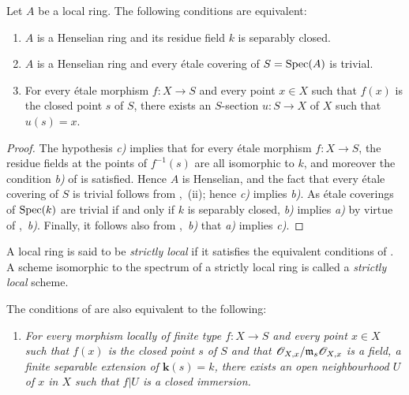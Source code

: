 \begin{proposition}[18.8.1]
\label{IV.18.8.1}
Let $A$ be a local ring.
The following conditions are equivalent:
\begin{enumerate}[label=\emph{\alph*)}]
  \item $A$ is a Henselian ring and its residue field $k$ is separably closed.
  \item $A$ is a Henselian ring and every \'{e}tale covering of $S=\operatorname{Spec}(A)$ is trivial.
  \item For every \'{e}tale morphism $f:X\to S$ and every point $x\in X$ such that $f(x)$ is the closed point $s$ of $S$, there exists an $S$-section $u:S\to X$ of $X$ such that $u(s)=x$.
\end{enumerate}
\end{proposition}

\begin{proof}
The hypothesis \emph{c)} implies that for every \'{e}tale morphism $f:X\to S$, the residue fields at the points of $f^{-1}(s)$ are all isomorphic to $k$, and moreover the condition \emph{b)} of  is satisfied.
Hence $A$ is Henselian, and the fact that every \'{e}tale covering of $S$ is trivial follows from ,~(ii);
hence \emph{c)} implies \emph{b)}.
As \'{e}tale coverings of $\operatorname{Spec}(k)$ are trivial if and only if $k$ is separably closed, \emph{b)} implies \emph{a)} by virtue of ,~\emph{b)}.
Finally, it follows also from ,~\emph{b)} that \emph{a)} implies \emph{c)}.
\end{proof}

\begin{definition}[18.8.2]
\label{IV.18.8.2}
A local ring is said to be \emph{strictly local} if it satisfies the equivalent conditions of .
A scheme isomorphic to the spectrum of a strictly local ring is called a \emph{strictly local} scheme.
\end{definition}

\begin{remark}[18.8.3]
\label{IV.18.8.3}
The conditions of  are also equivalent to the following:
\begin{enumerate}
  \item[\textup{d)}] \itshape For every morphism locally of finite type $f:X\to S$ and every point $x\in X$ such that $f(x)$ is the closed point $s$ of $S$ and that $\mathscr{O}_{X,x}/\mathfrak{m}_s\mathscr{O}_{X,x}$ is a field, a finite separable extension of $\boldsymbol{k}(s)=k$, there exists an open neighbourhood $U$ of $x$ in $X$ such that $f|U$ is a closed immersion.
\end{enumerate}
\end{remark}

